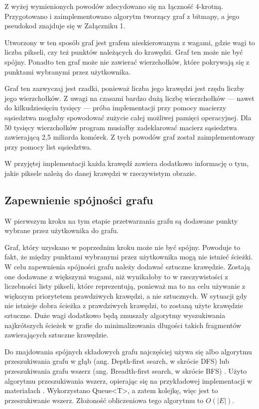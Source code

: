 \documentclass[a4paper,11pt,twoside,openright]{report}
\theoremstyle{definition}
\begin{document}
\bigskip

Z wyżej wymienionych powodów zdecydowano się na łączność 4-krotną. Przygotowano i zaimplementowano algorytm tworzący graf z bitmapy, a jego pseudokod znajduje się w Załączniku 1. %

Utworzony w ten sposób graf jest grafem nieskierowanym z wagami, gdzie wagi to liczba pikseli, czy też punktów należących do krawędzi. Graf ten może nie być spójny. Ponadto ten graf może nie zawierać wierzchołków, które pokrywają się z punktami wybranymi przez użytkownika.

Graf ten zazwyczaj jest rzadki, ponieważ liczba jego krawędzi jest rzędu liczby jego wierzchołków.  Z uwagi na czasami bardzo dużą liczbę wierzchołków --- nawet do kilkudziesięciu tysięcy --- próba implementacji przy pomocy macierzy sąsiedztwa mogłaby spowodować zużycie całej możliwej pamięci operacyjnej. Dla 50 tysięcy wierzchołków program musiałby zadeklarować macierz sąsiedztwa zawierającą 2,5 miliarda komórek. Z tych powodów graf został zaimplementowany przy pomocy list sąsiedztwa.

W przyjętej implementacji każda krawędź zawiera dodatkowo informację o tym, jakie piksele należą do danej krawędzi w rzeczywistym obrazie.

\subsection {Zapewnienie spójności grafu}

W pierwszym kroku na tym etapie przetwarzania grafu są dodawane punkty wybrane przez użytkownika do grafu.

Graf, który uzyskano w poprzednim kroku może nie być spójny. Powoduje to fakt, że między punktami wybranymi przez użytkownika mogą nie istnieć ścieżki. W celu zapewnienia spójności grafu należy dodawać sztuczne krawędzie. Zostają one dodawane z większymi wagami, niż wynikałoby to w rzeczywistości z liczebności listy pikseli, które reprezentują, ponieważ ma to na celu używanie z większym priorytetem prawdziwych krawędzi, a nie sztucznych. W sytuacji gdy nie istnieje dobra ścieżka z prawdziwych krawędzi, to zostaną użyte krawędzie sztuczne. Duże wagi dodatkowo będą zmuszały algorytmy wyszukiwania najkrótszych ścieżek w grafie do minimalizowania długości takich fragmentów zawierających sztuczne krawędzie.

Do znajdowania spójnych składowych grafu najczęściej używa się albo algorytmu przeszukiwania grafu w głąb (ang. Depth-first search, w skrócie DFS) lub przeszukiwania grafu wszerz (ang. Breadth-first search, w skrócie BFS) \cite{Algorytmy Sedgewick}. Użyto algorytmu przeszukiwania wszerz, opierając się na przykładowej implementacji w materiałach \cite{AiSD2}. Wykorzystano Queue<T>, a zatem kolejkę, więc jest to przeszukiwanie wszerz. Złożoność obliczeniowa tego algorytmu to $O(|E|)$.
\end{document}
